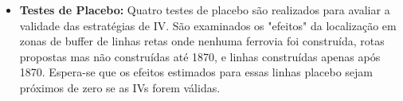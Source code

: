 \documentclass[12pt]{article}
\begin{document}
\begin{itemize}
\begin{align}
    \end{align}
    Onde:
    \begin{itemize}
        \item $R_{it}$: Dummy que vale 1 se a cidade $i$ tem acesso à ferrovia no ano $t$.
        \item $L_i^z$: Um dos instrumentos $z$ (dummy de buffer de linha reta ou dummy de inclusão na proposta de rede).
        \item $\hat{R_{it}}$: Acesso à ferrovia previsto pelo primeiro estágio.
        \item $\sigma$: Coeficiente de interesse no segundo estágio, estimado pelo 2SLS, que representa o impacto causal do acesso à ferrovia.
        \item Os demais termos são definidos de forma análoga às equações anteriores.
    \end{itemize}
    \item \textbf{Testes de Placebo:} Quatro testes de placebo são realizados para avaliar a validade das estratégias de IV. São examinados os "efeitos" da localização em zonas de buffer de linhas retas onde nenhuma ferrovia foi construída, rotas propostas mas não construídas até 1870, e linhas construídas apenas após 1870. Espera-se que os efeitos estimados para essas linhas placebo sejam próximos de zero se as IVs forem válidas.
\end{itemize}
\end{document}
